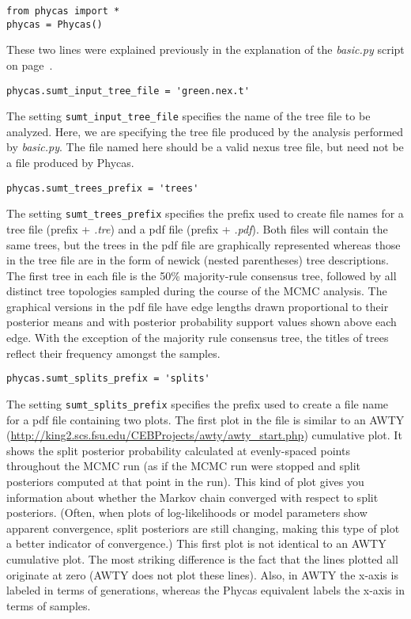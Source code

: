\documentclass[10pt]{article}
\newcommand{\pathname}[1]{{\em #1}}			%
\newcommand{\opt}[1]{{\tt \small #1}\index{#1}}		%
\begin{document}
\begin{verbatim}
from phycas import *
phycas = Phycas()
\end{verbatim}
%
These two lines were explained previously in the explanation of the \pathname{basic.py} script on page~\pageref{subsec:basicpyexplanation}.
%
\begin{verbatim}
phycas.sumt_input_tree_file = 'green.nex.t'
\end{verbatim}
%
The setting \opt{sumt\_input\_tree\_file} specifies the name of the tree file to be analyzed. Here, we are specifying the tree file produced by the analysis performed by \pathname{basic.py}. The file named here should be a valid nexus tree file, but need not be a file produced by Phycas.
%
\begin{verbatim}
phycas.sumt_trees_prefix = 'trees'
\end{verbatim}
%
The setting \opt{sumt\_trees\_prefix} specifies the prefix used to create file names for a tree file (prefix + \pathname{.tre}) and a pdf file (prefix + \pathname{.pdf}). Both files will contain the same trees, but the trees in the pdf file are graphically represented whereas those in the tree file are in the form of newick (nested parentheses) tree descriptions. The first tree in each file is the 50\% majority-rule consensus tree, followed by all distinct tree topologies sampled during the course of the MCMC analysis. The graphical versions in the pdf file have edge lengths drawn proportional to their posterior means and with posterior probability support values shown above each edge. With the exception of the majority rule consensus tree, the titles of trees reflect their frequency amongst the samples. 
%
\begin{verbatim}
phycas.sumt_splits_prefix = 'splits'
\end{verbatim}
%
The setting \opt{sumt\_splits\_prefix} specifies the prefix used to create a file name for a pdf file containing two plots. The first plot in the file is similar to an AWTY (\url{http://king2.scs.fsu.edu/CEBProjects/awty/awty_start.php}) cumulative plot. It shows the split posterior probability calculated at evenly-spaced points throughout the MCMC run (as if the MCMC run were stopped and split posteriors computed at that point in the run). This kind of plot gives you information about whether the Markov chain converged with respect to split posteriors. (Often, when plots of log-likelihoods or model parameters show apparent convergence, split posteriors are still changing, making this type of plot a better indicator of convergence.) This first plot is not identical to an AWTY cumulative plot. The most striking difference is the fact that the lines plotted all originate at zero (AWTY does not plot these lines). Also, in AWTY the x-axis is labeled in terms of generations, whereas the Phycas equivalent labels the x-axis in terms of samples. 
\end{document}
